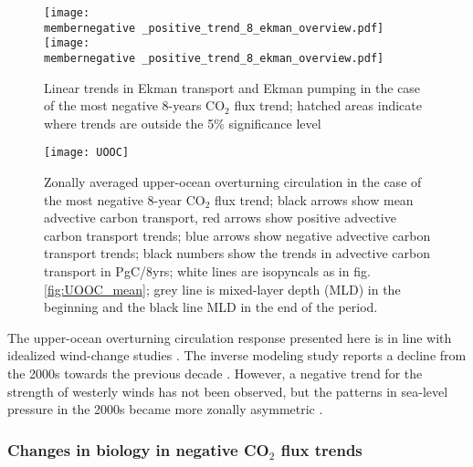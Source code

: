 \documentclass[12pt]{article}
\newcommand{\membernegative}{m143_1995_2002}
\begin{document}
\begin{figure}[h!]
	\centering
	\texttt{[image: \\membernegative \_positive\_trend\_8\_ekman\_overview.pdf]}
	\texttt{[image: \\membernegative \_positive\_trend\_8\_ekman\_overview.pdf]}
	\vspace{-5mm}
	\caption{Linear trends in Ekman transport and Ekman pumping in the case of the most negative 8-years CO$_2$ flux trend; hatched areas indicate where trends are outside the 5\% significance level}
	\label{fig:ekman_neg}
\end{figure}


\begin{figure}[h!]
	\centering
	\texttt{[image: UOOC]}
	\vspace{-10mm}
	\caption{Zonally averaged upper-ocean overturning circulation in the case of the most negative 8-year CO$_2$ flux trend; black arrows show mean advective carbon transport, red arrows show positive advective carbon transport trends; blue arrows show negative advective carbon transport trends; black numbers show the trends in advective carbon transport in PgC/8yrs; white lines are isopyncals as in fig. \ref{fig:UOOC_mean}; grey line is mixed-layer depth (MLD) in the beginning and the black line MLD in the end of the period.}%
	\label{fig:UOOC_neg}
\end{figure}


The upper-ocean overturning circulation response presented here is in line with idealized wind-change studies \citep{Lauderdale2013}. The inverse modeling study reports a decline from the 2000s towards the previous decade \citep{DeVries2017}. However, a negative trend for the strength of westerly winds has not been observed, but the patterns in sea-level pressure in the 2000s became more zonally asymmetric \citep{landschuetzer2015}.


\clearpage

\subsubsection{Changes in biology in negative CO$_2$ flux trends}
\label{sec:trends_neg_biology}
\end{document}
